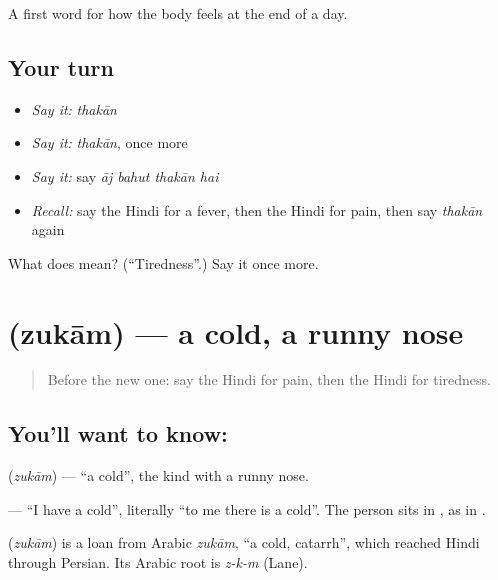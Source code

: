 \begin{grammarlens}[title={What you've built}]
A first word for how the body feels at the end of a day.
\end{grammarlens}

\subsection*{Your turn}
\begin{itemize}
\raggedright
  \item \emph{Say it:} \emph{thakān}
  \item \emph{Say it:} \emph{thakān}, once more
  \item \emph{Say it:} say \emph{āj bahut thakān hai}
  \item \emph{Recall:} say the Hindi for a fever, then the Hindi for pain, then say \emph{thakān} again
\end{itemize}

\begin{tcolorbox}[breakable,colback=teal!4,colframe=teal!35!black,title={Before you move on}]
What does  mean? (\textquotedblleft{}Tiredness\textquotedblright{}.) Say it once more.
\end{tcolorbox}
\section[\texorpdfstring{\hi{ज़ुकाम} (zukām)}{ज़ुकाम (zukām)}]{ (zukām) — a cold, a runny nose}

\label{lesson:HI-C106-zukam}



\begin{quote}
Before the new one: say the Hindi for pain, then the Hindi for tiredness.
\end{quote}

\subsection*{You'll want to know: }
\textbf{} (\emph{zukām}) — \textquotedblleft{}a cold\textquotedblright{}, the kind with a runny nose.

\textbf{  } — \textquotedblleft{}I have a cold\textquotedblright{}, literally \textquotedblleft{}to me there is a cold\textquotedblright{}. The person sits in \textbf{}, as in \textbf{  }.

\begin{cousinweb}
\textbf{} (\emph{zukām}) is a loan from Arabic \emph{zukām}, \textquotedblleft{}a cold, catarrh\textquotedblright{}, which reached Hindi through Persian. Its Arabic root is \emph{z-k-m} (Lane).
\end{cousinweb}

